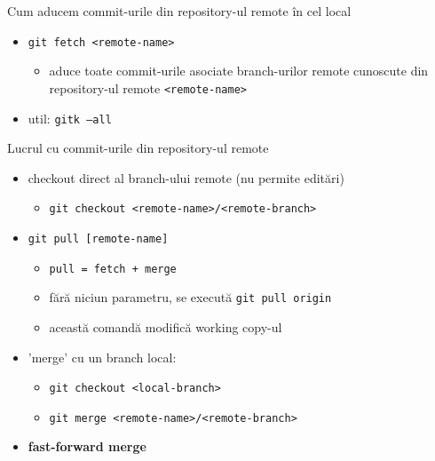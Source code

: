\documentclass{beamer}
\begin{document}
\begin{frame}{Cum aducem commit-urile din repository-ul remote în cel local}
\begin{itemize} %
\item \texttt{git fetch <remote-name>}
\begin{itemize} %
	\item aduce toate commit-urile asociate branch-urilor remote cunoscute din repository-ul remote \texttt{<remote-name>}
\end{itemize}
\item util: \texttt{gitk --all}
\end{itemize}
\end{frame}

\begin{frame}{Lucrul cu commit-urile din repository-ul remote}
\begin{itemize} %
\item checkout direct al branch-ului remote (nu permite editări)
\begin{itemize} %
	\item \texttt{git checkout <remote-name>/<remote-branch>}
\end{itemize}
\pause\item \texttt{git pull [remote-name]}
\begin{itemize} %
	\item \texttt{pull = fetch + merge}
	\item fără niciun parametru, se execută \texttt{git pull origin}
	\item această comandă modifică working copy-ul
\end{itemize}
\pause\item 'merge' cu un branch local:
\begin{itemize} %
	\item \texttt{git checkout <local-branch>}
	\item \texttt{git merge <remote-name>/<remote-branch>}
\end{itemize}
\pause \item \textbf{fast-forward merge}
\end{itemize}
\end{frame}
\end{document}
